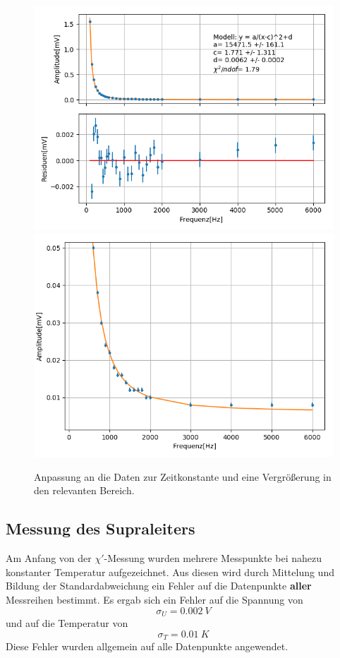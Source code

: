 \documentclass[12pt,a4paper]{article}
\begin{document}
\begin{figure}
\centering
\includegraphics[scale=0.8]{Bilder/Vorversuch4/Vor4_1.png}
\includegraphics[scale=0.8]{Bilder/Vorversuch4/Vor4_2.png}
\caption{Anpassung an die Daten zur Zeitkonstante und eine Vergrößerung in den relevanten Bereich.}
\label{fig:Vor4_anpassung}
\end{figure}

\newpage
\subsection{Messung des Supraleiters}
Am Anfang von der $\chi'$-Messung wurden mehrere Messpunkte bei nahezu konstanter Temperatur aufgezeichnet. Aus diesen wird durch Mittelung und Bildung der Standardabweichung ein Fehler auf die Datenpunkte \textbf{aller} Messreihen bestimmt. Es ergab sich ein Fehler auf die Spannung von
\begin{equation*}
\sigma_U = \SI{0.002}{V}
\end{equation*}
und auf die Temperatur von
\begin{equation*}
\sigma_T = \SI{0.01}{K}
\end{equation*}
Diese Fehler wurden allgemein auf alle Datenpunkte angewendet.
\end{document}
